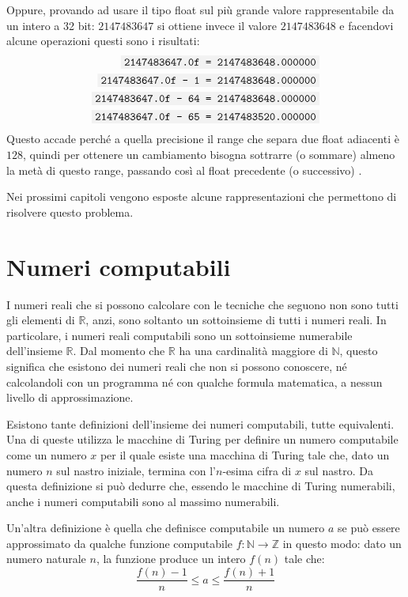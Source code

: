 \documentclass[Lau]{sapthesis}
\newcommand{\code}[1]{\colorbox{light-gray}{\texttt{#1}}}
\begin{document}
Oppure, provando ad usare il tipo float sul più grande valore rappresentabile da un intero a 32 bit: $2147483647$ si ottiene invece il valore $2147483648$ e facendovi alcune operazioni questi sono i risultati:
\begin{align*}
\code{2147483647.0f = 2147483648.000000}\\
\code{2147483647.0f - 1 = 2147483648.000000}\\
\code{2147483647.0f - 64 = 2147483648.000000}\\
\code{2147483647.0f - 65 = 2147483520.000000}\\
\end{align*}
Questo accade perché a quella precisione il range che separa due float adiacenti è $128$, quindi per ottenere un cambiamento bisogna sottrarre (o sommare) almeno la metà di questo range, passando così al float precedente (o successivo) \cite{97Things}.

\medskip

Nei prossimi capitoli vengono esposte alcune rappresentazioni che 
permettono di risolvere questo problema.


\section{Numeri computabili}
I numeri reali che si possono calcolare con le tecniche che seguono non sono tutti gli elementi di $\mathbb{R}$, anzi, sono soltanto un sottoinsieme di tutti i numeri reali. In particolare, i numeri reali computabili sono un sottoinsieme numerabile dell'insieme $\mathbb{R}$. Dal momento che $\mathbb{R}$ ha una cardinalità maggiore di $\mathbb{N}$, questo significa che esistono dei numeri reali che non si possono conoscere, né calcolandoli con un programma né con qualche formula matematica, a nessun livello di approssimazione.

Esistono tante definizioni dell'insieme dei numeri computabili, tutte equivalenti. Una di queste \cite{Minsky} utilizza le macchine di Turing per definire un numero computabile come un numero $x$ per il quale esiste una macchina di Turing tale che, dato un numero $n$ sul nastro iniziale, termina con l'$n$-esima cifra di $x$ sul nastro. Da questa definizione si può dedurre che, essendo le macchine di Turing numerabili, anche i numeri computabili sono al massimo numerabili.

Un'altra definizione è quella che definisce computabile un numero $a$ se può essere approssimato da qualche funzione computabile $f : \mathbb{N} \rightarrow \mathbb{Z}$ in questo modo: dato un numero naturale $n$, la funzione produce un intero $f(n)$ tale che:
$$\frac{f(n)-1}{n} \leq a \leq \frac{f(n)+1}{n}$$
\end{document}

